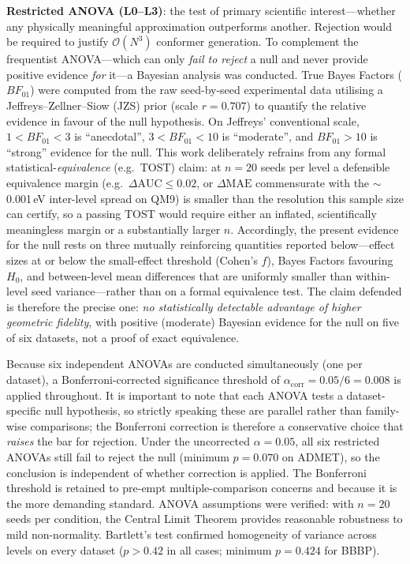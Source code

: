 \documentclass[pdflatex,sn-vancouver-num]{sn-jnl}%
\theoremstyle{thmstyleone}%
\theoremstyle{thmstyletwo}%
\theoremstyle{thmstylethree}%
\begin{document}
\textbf{Restricted ANOVA (L0--L3)}: the test of primary scientific
interest---whether any physically meaningful approximation outperforms
another.  Rejection would be required to justify $\mathcal{O}(N^3)$
conformer generation. To complement the frequentist ANOVA---which can only \emph{fail to reject} a null and never provide positive evidence \emph{for} it---a Bayesian analysis was conducted. True Bayes Factors ($BF_{01}$) were computed from the raw seed-by-seed experimental data utilising a Jeffreys--Zellner--Siow (JZS) prior (scale $r=0.707$) to quantify the relative evidence in favour of the null hypothesis. On Jeffreys' conventional scale, $1 < BF_{01} < 3$ is ``anecdotal'', $3 < BF_{01} < 10$ is ``moderate'', and $BF_{01} > 10$ is ``strong'' evidence for the null. This work deliberately refrains from any formal statistical-\emph{equivalence} (e.g.\ TOST) claim: at $n{=}20$ seeds per level a defensible equivalence margin (e.g.\ $\Delta\mathrm{AUC}\!\le\!0.02$, or $\Delta\mathrm{MAE}$ commensurate with the $\sim$0.001\,eV inter-level spread on QM9) is smaller than the resolution this sample size can certify, so a passing TOST would require either an inflated, scientifically meaningless margin or a substantially larger $n$. Accordingly, the present evidence for the null rests on three mutually reinforcing quantities reported below---effect sizes at or below the small-effect threshold (Cohen's $f$), Bayes Factors favouring $H_0$, and between-level mean differences that are uniformly smaller than within-level seed variance---rather than on a formal equivalence test. The claim defended is therefore the precise one: \emph{no statistically detectable advantage of higher geometric fidelity}, with positive (moderate) Bayesian evidence for the null on five of six datasets, not a proof of exact equivalence.

Because six independent ANOVAs are conducted simultaneously (one per dataset),
a Bonferroni-corrected significance threshold of $\alpha_{\mathrm{corr}} = 0.05 / 6 = 0.008$
is applied throughout.  It is important to note that each ANOVA tests a
dataset-specific null hypothesis, so strictly speaking these are parallel
rather than family-wise comparisons; the Bonferroni correction is therefore
a conservative choice that \emph{raises} the bar for rejection.  Under the
uncorrected $\alpha = 0.05$, all six restricted ANOVAs still fail to reject
the null (minimum $p = 0.070$ on ADMET), so the conclusion is independent
of whether correction is applied.  The Bonferroni threshold is retained to
pre-empt multiple-comparison concerns and because it is the more demanding
standard.  ANOVA assumptions were verified: with $n{=}20$ seeds per condition, the Central
Limit Theorem provides reasonable robustness to mild non-normality.  Bartlett's
test confirmed homogeneity of variance across levels on every dataset
($p > 0.42$ in all cases; minimum $p = 0.424$ for BBBP).
\end{document}
